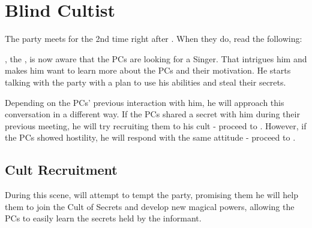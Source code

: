 \section{Blind Cultist}
\label{sec:2ndMeeting}

The party meets \npcBlindBeggar{} for the 2nd time right after . When they do, read the following:


\npcBlindBeggar{}, the \enemyCorruptedLightweaverC{}, is now aware that the PCs are looking for a Singer. That intrigues him and makes him want to learn more about the PCs and their motivation. He starts talking with the party with a plan to use his abilities and steal their secrets.

Depending on the PCs' previous interaction with him, he will approach this conversation in a different way. If the PCs shared a secret with him during their previous meeting, he will try recruiting them to his cult - proceed to . However, if the PCs showed hostility, he will respond with the same attitude - proceed to .



\subsection{Cult Recruitment}
\label{ssec:2ndMeetingRecruit}

During this scene, \npcBlindBeggar{} will attempt to tempt the party, promising them he will help them to join the Cult of Secrets and develop new magical powers, allowing the PCs to easily learn the secrets held by the informant.

